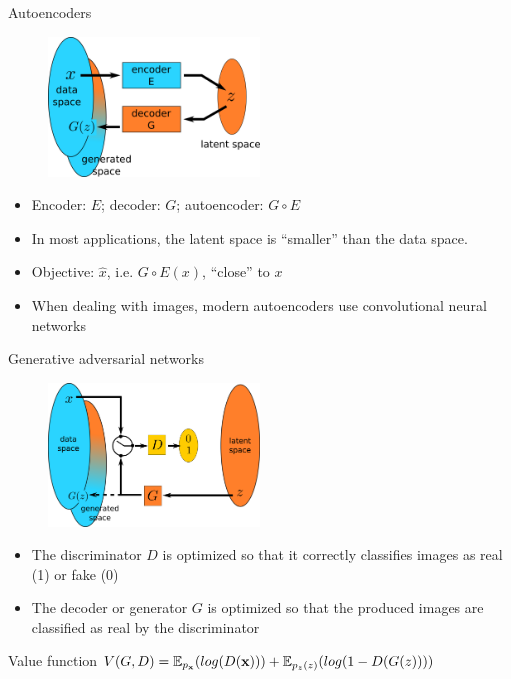 \documentclass[xcolor=pdftex,dvipsnames,table,mathserif]{beamer}
\begin{document}
\begin{frame}{Autoencoders}

  \begin{figure}[ht]
    \centering
    \includegraphics[width=0.5\textwidth]{ae.png}
  \end{figure}

  \begin{itemize}
  \item Encoder: $E$; decoder: $G$; autoencoder: $G \circ E$
  \item In most applications, the latent space is ``smaller'' than the data space.
  \item Objective: $\hat{x}$, i.e. $G \circ E (x)$, ``close'' to $x$
  \item When dealing with images, modern autoencoders use convolutional neural networks
  \end{itemize}

\end{frame}

\begin{frame}{Generative adversarial networks \cite{goodfellow_generative_2014}}

  \begin{figure}[ht]
    \centering
    \includegraphics[width=0.5\textwidth]{gan2}
  \end{figure}

  \begin{itemize}
  \item The \alert{discriminator} $D$ is optimized so that it correctly classifies images as real (1) or fake (0)
  \item The decoder or \alert{generator} $G$ is optimized so that the produced images are classified as real by the discriminator
  \end{itemize}

  \begin{block}{Value function}
    $V(G,D) = \mathbb{E}_{p_{\mathbf{x}}}(log(D(\mathbf{x}))) + \mathbb{E}_{p_z(z)}(log(1 - D(G(z))))$
  \end{block}

\end{frame}
\end{document}
